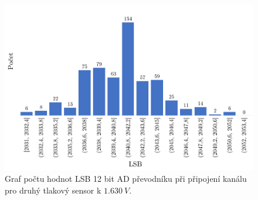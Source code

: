 \begin{figure}[H]
    \caption{Graf počtu hodnot LSB 12 bit AD převodníku při připojení kanálu pro druhý tlakový sensor k $1.630 \ V$.}
    \label{fig:hist_vacuum2_1_6}
    \includegraphics[width=1\textwidth]{graphs/vacuum2_16.png}


\end{figure}
